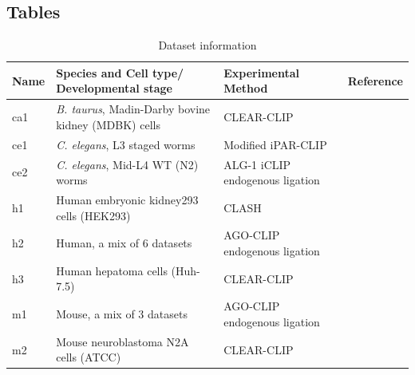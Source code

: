 \documentclass{bmcart}
\begin{document}
\begin{backmatter}

\clearpage
\section*{Tables}
\begin{table}[h!]
\caption{Dataset information}
\label{tbl:dataset_description}
\begin{tabular}{|l|p{5cm}|p{4cm}|l|}
	\hline
	\textbf{Name} & \textbf{Species and Cell type/ Developmental stage} & \textbf{Experimental Method} & \textbf{Reference} \\
	\hline
	
    ca1 &
	\textit{B. taurus}, Madin-Darby bovine kidney (MDBK) cells &
	CLEAR-CLIP                        
	& \cite{scheel2017global} \\
	\hline
	
    ce1 &
	\textit{C. elegans}, L3 staged worms & 
	Modified iPAR-CLIP & 
	\cite{grosswendt2014unambiguous}  \\
	\hline

    ce2 &
	\textit{C. elegans}, Mid-L4 WT (N2) worms & 
	ALG-1 iCLIP endogenous ligation & 
	\cite{broughton2016pairing} \\
	\hline

    h1 &
	Human embryonic kidney293 cells (HEK293) & 
	CLASH  & 
	\cite{helwak2013mapping} \\
	\hline
	
    h2 &
	Human, a mix of 6 datasets & 
	AGO-CLIP endogenous ligation &  
	\cite{grosswendt2014unambiguous} \\
	\hline
	
    h3 &
	Human hepatoma cells (Huh-7.5) & 
	CLEAR-CLIP & 
	\cite{darnell_moore2015mirna} \\
	\hline
	
    m1 &
	Mouse, a mix of 3 datasets & 
	AGO-CLIP endogenous ligation & 
	\cite{grosswendt2014unambiguous} \\
	\hline
	
    m2 &
	Mouse neuroblastoma N2A cells (ATCC)  & 
	CLEAR-CLIP & 
	\cite{darnell_moore2015mirna} \\
	\hline
\end{tabular}
\end{table}


\end{backmatter}
\end{document}
